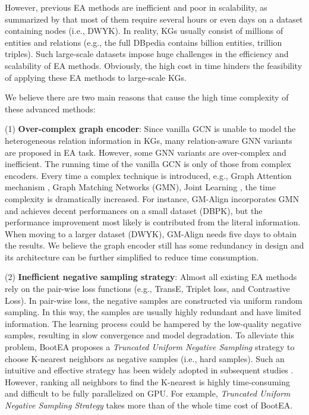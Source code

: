 \documentclass[sigconf]{acmart}
\begin{document}
However, previous EA methods are inefficient and poor in scalability, as summarized by \citet{9174835} that most of them require several hours \cite{DBLP:conf/emnlp/LiCHSLC19,DBLP:conf/ijcai/SunHZQ18,DBLP:conf/acl/CaoLLLLC19} or even days \cite{DBLP:conf/acl/XuWYFSWY19} on a dataset containing  nodes (i.e., DWYK).
In reality, KGs usually consist of millions of entities and relations (e.g., the full DBpedia contains  billion entities,  trillion triples).
Such large-scale datasets impose huge challenges in the efficiency and scalability of EA methods.
Obviously, the high cost in time hinders the feasibility of applying these EA methods to large-scale KGs.

We believe there are two main reasons that cause the high time complexity of these advanced methods:

(1) \textbf{Over-complex graph encoder}:
Since vanilla GCN is unable to model the heterogeneous relation information in KGs, many relation-aware GNN variants are proposed in EA task.
However, some GNN variants are over-complex and inefficient.
The running time of the vanilla GCN \cite{DBLP:conf/emnlp/WangLLZ18} is only  of those from complex encoders.
Every time a complex technique is introduced, e.g., Graph Attention mechanism \cite{DBLP:conf/iclr/VelickovicCCRLB18}, Graph Matching Networks \cite{DBLP:conf/icml/LiGDVK19} (GMN), Joint Learning \cite{DBLP:conf/emnlp/LiCHSLC19}, the time complexity is dramatically increased.
For instance, GM-Align \cite{DBLP:conf/acl/XuWYFSWY19} incorporates GMN and achieves decent performances on a small dataset (DBPK), but the performance improvement most likely is contributed from the literal information.
When moving to a larger dataset (DWYK), GM-Align needs five days to obtain the results.
We believe the graph encoder still has some redundancy in design and its architecture can be further simplified to reduce time consumption.

(2) \textbf{Inefficient negative sampling strategy}:
Almost all existing EA methods rely on the pair-wise loss functions (e.g., TransE, Triplet loss, and Contrastive Loss).
In pair-wise loss, the negative samples are constructed via uniform random sampling.
In this way, the samples are usually highly redundant and have limited information.
The learning process could be hampered by the low-quality negative samples, resulting in slow convergence and model degradation.
To alleviate this problem, BootEA \cite{DBLP:conf/ijcai/SunHZQ18} proposes a \emph{Truncated Uniform Negative Sampling} strategy to choose K-nearest neighbors as negative samples (i.e., hard samples).
Such an intuitive and effective strategy has been widely adopted in subsequent studies \cite{DBLP:conf/emnlp/LiCHSLC19,DBLP:journals/corr/abs-2004-13579,DBLP:conf/acl/CaoLLLLC19}.
However, ranking all neighbors to find the K-nearest is highly time-consuming and difficult to be fully parallelized on GPU.
For example, \emph{Truncated Uniform Negative Sampling Strategy} takes more than  of the whole time cost of BootEA.
\end{document}
